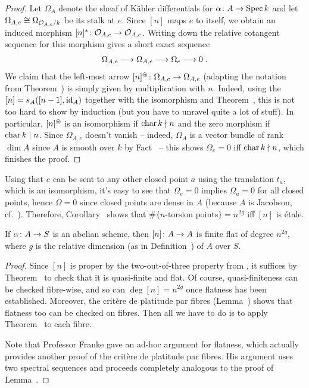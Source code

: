 \documentclass[a4paper,parskip=half,numbers=enddot, DIV=12]{scrreprt}
\begin{document}
\begin{proof}
	Let $\Omega_A$ denote the sheaf of Kähler differentials for $\alpha\colon A\morphism\Spec k$ and let $\Omega_{A,e}\cong \Omega_{\mathcal{O}_{A,e}/k}$ be its stalk at $e$. Since $[n]$ maps $e$ to itself, we obtain an induced morphism $[n]^*\colon \Oo_{A,e}\morphism\Oo_{A,e}$. Writing down the relative cotangent sequence for this morphism gives a short exact sequence
	\begin{align*}
		\Omega_{A,e}\morphism \Omega_{A,e}\morphism \Omega_e\morphism 0\;.
	\end{align*}
	We claim that the left-most arrow $[n]^\oast\colon \Omega_{A,e}\morphism\Omega_{A,e}$ (adapting the notation from Theorem~) is simply given by multiplication with $n$. Indeed, using the $[n]=s_A([n-1],\operatorname{id}_A)$ together with the isomorphism  and Theorem~, this is not too hard to show by induction (but you have to unravel quite a lot of stuff). In particular, $[n]^\oast$ is an isomorphism if $\operatorname{char} k\nmid n$ and the zero morphism if $\operatorname{char} k\mid n$. Since $\Omega_{A,e}$ doesn't vanish -- indeed, $\Omega_A$ is a vector bundle of rank $\dim A$ since $A$ is smooth over $k$ by Fact~ -- this shows $\Omega_e=0$ iff $\operatorname{char} k\nmid n$, which finishes the proof.
\end{proof}
\begin{rem*}
	Using that $e$ can be sent to any other closed point $a$ using the translation $t_a$, which is an isomorphism, it's easy to see that $\Omega_e=0$ implies $\Omega_a=0$ for all closed points, hence $\Omega=0$ since closed points are dense in $A$ (because $A$ is Jacobson, cf.\ \cite[Definition~2.4.2]{alggeo1}). Therefore, Corollary~ shows that $\#\{n\text{-torsion points}\}=n^{2g}$ iff $[n]$ is étale.
\end{rem*}
\begin{cor}
	If $\alpha\colon A\morphism S$ is an abelian scheme, then $[n]\colon A\morphism A$ is finite flat of degree $n^{2g}$, where $g$ is the relative dimension (as in Definition~) of $A$ over $S$.
\end{cor}
\begin{proof}
	Since $[n]$ is proper by the two-out-of-three property from \cite[Proposition~2.4.1]{alggeo2}, it suffices by Theorem~ to check that it is quasi-finite and flat. Of course, quasi-finiteness can be checked fibre-wise, and so can $\deg{[n]}=n^{2g}$ once flatness has been established. Moreover, the critère de platitude par fibres (Lemma~) shows that flatness too can be checked on fibres. Then all we have to do is to apply Theorem~ to each fibre.
	
	Note that Professor Franke gave an ad-hoc argument for flatness, which actually provides another proof of the critère de platitude par fibres. His argument uses two spectral sequences and proceeds completely analogous to the proof of Lemma~.
\end{proof}
\end{document}
